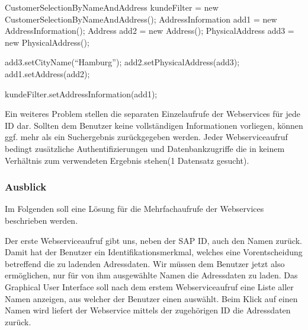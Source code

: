 CustomerSelectionByNameAndAddress kundeFilter 	= new CustomerSelectionByNameAndAddress();
AddressInformation add1							= new AddressInformation();
Address add2 									= new Address();
PhysicalAddress add3 							= new PhysicalAddress();

add3.setCityName(``Hamburg'');
add2.setPhysicalAddress(add3);
add1.setAddress(add2);

kundeFilter.setAddressInformation(add1);
 

Ein weiteres Problem stellen die separaten Einzelaufrufe der Webservices für jede ID dar. Sollten dem Benutzer keine vollständigen 
Informationen vorliegen, können ggf. mehr als ein Suchergebnis zurückgegeben werden. Jeder Webserviceaufruf bedingt zusätzliche
Authentifizierungen und Datenbankzugriffe die in keinem Verhältnis zum verwendeten Ergebnis stehen(1 Datensatz gesucht).

\subsubsection{Ausblick}

Im Folgenden soll eine Lösung für die Mehrfachaufrufe der Webservices beschrieben werden. 

Der erste Webserviceaufruf gibt uns, neben der SAP ID, auch den Namen zurück. Damit hat der Benutzer ein Identifikationsmerkmal, 
welches eine Vorentscheidung betreffend die zu ladenden Adressdaten. Wir müssen dem Benutzer jetzt also ermöglichen, nur für 
von ihm ausgewählte Namen die Adressdaten zu laden. Das Graphical User Interface soll nach dem erstem Webserviceaufruf eine 
Liste aller Namen anzeigen, aus welcher der Benutzer einen auswählt. Beim Klick auf einen Namen wird liefert der Webservice 
mittels der zugehörigen ID die Adressdaten zurück. 